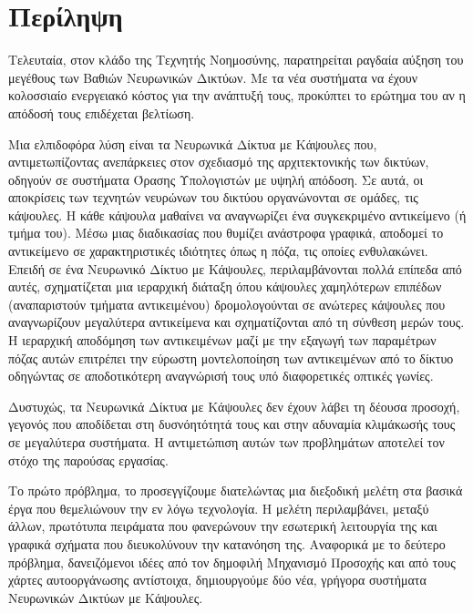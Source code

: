 \chapter*{Περίληψη}



Τελευταία, στον κλάδο της Τεχνητής Νοημοσύνης, παρατηρείται ραγδαία αύξηση του μεγέθους των Βαθιών Νευρωνικών Δικτύων. Με τα νέα συστήματα να έχουν κολοσσιαίο ενεργειακό κόστος για την ανάπτυξή τους, προκύπτει το ερώτημα του αν η απόδοσή τους επιδέχεται βελτίωση.\par

Μια ελπιδοφόρα λύση είναι τα Νευρωνικά Δίκτυα με Κάψουλες που, αντιμετωπίζοντας ανεπάρκειες στον σχεδιασμό της αρχιτεκτονικής των δικτύων, οδηγούν σε συστήματα Όρασης Υπολογιστών με υψηλή απόδοση. Σε αυτά, οι αποκρίσεις των τεχνητών νευρώνων του δικτύου οργανώνονται σε ομάδες, τις κάψουλες. Η κάθε κάψουλα μαθαίνει να αναγνωρίζει ένα συγκεκριμένο αντικείμενο (ή τμήμα του). Μέσω μιας διαδικασίας που θυμίζει ανάστροφα γραφικά, αποδομεί το αντικείμενο σε χαρακτηριστικές ιδιότητες όπως η πόζα, τις οποίες ενθυλακώνει. Επειδή σε ένα Νευρωνικό Δίκτυο με Κάψουλες, περιλαμβάνονται πολλά επίπεδα από αυτές, σχηματίζεται μια ιεραρχική διάταξη όπου κάψουλες χαμηλότερων επιπέδων (αναπαριστούν τμήματα αντικειμένου) δρομολογούνται σε ανώτερες κάψουλες που αναγνωρίζουν μεγαλύτερα αντικείμενα και σχηματίζονται από τη σύνθεση μερών τους. Η ιεραρχική αποδόμηση των αντικειμένων μαζί με την εξαγωγή των παραμέτρων πόζας αυτών επιτρέπει την εύρωστη μοντελοποίηση των αντικειμένων από το δίκτυο οδηγώντας σε αποδοτικότερη αναγνώρισή τους υπό διαφορετικές οπτικές γωνίες.\par

Δυστυχώς, τα Νευρωνικά Δίκτυα με Κάψουλες δεν έχουν λάβει τη δέουσα προσοχή, γεγονός που αποδίδεται στη δυσνόητότητά τους και στην αδυναμία κλιμάκωσής τους σε μεγαλύτερα συστήματα. Η αντιμετώπιση αυτών των προβλημάτων αποτελεί τον στόχο της παρούσας εργασίας.\par

Το πρώτο πρόβλημα, το προσεγγίζουμε διατελώντας μια διεξοδική μελέτη στα βασικά έργα που θεμελιώνουν την εν λόγω τεχνολογία. Η μελέτη περιλαμβάνει, μεταξύ άλλων, πρωτότυπα πειράματα που φανερώνουν την εσωτερική λειτουργία της και γραφικά σχήματα που διευκολύνουν την κατανόηση της. Αναφορικά με το δεύτερο πρόβλημα, δανειζόμενοι ιδέες από τον δημοφιλή Μηχανισμό Προσοχής και από τους χάρτες αυτο\textendash οργάνωσης αντίστοιχα, δημιουργούμε δύο νέα, γρήγορα συστήματα Νευρωνικών Δικτύων με Κάψουλες.\par

